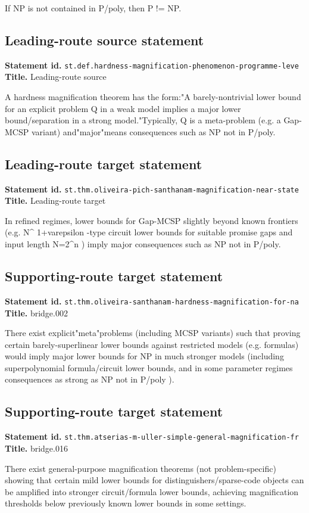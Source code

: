 \documentclass[11pt]{article}
\begin{document}
If NP is not contained in P/poly, then P != NP.
\subsection*{Leading-route source statement}
\textbf{Statement id.} \texttt{st.def.hardness-magnification-phenomenon-programme-leve}
\textbf{Title.} Leading-route source

A hardness magnification theorem has the form:"A barely-nontrivial lower bound for an explicit problem Q in a weak model implies a major lower bound/separation in a strong model."Typically, Q is a meta-problem (e.g. a Gap-MCSP variant) and"major"means consequences such as NP not in P/poly.
\subsection*{Leading-route target statement}
\textbf{Statement id.} \texttt{st.thm.oliveira-pich-santhanam-magnification-near-state}
\textbf{Title.} Leading-route target

In refined regimes, lower bounds for Gap-MCSP slightly beyond known frontiers (e.g. N\textasciicircum{} 1+varepsilon -type circuit lower bounds for suitable promise gaps and input length N=2\textasciicircum{}n ) imply major consequences such as NP not in P/poly.
\subsection*{Supporting-route target statement}
\textbf{Statement id.} \texttt{st.thm.oliveira-santhanam-hardness-magnification-for-na}
\textbf{Title.} bridge.002

There exist explicit"meta"problems (including MCSP variants) such that proving certain barely-superlinear lower bounds against restricted models (e.g. formulas) would imply major lower bounds for NP in much stronger models (including superpolynomial formula/circuit lower bounds, and in some parameter regimes consequences as strong as NP not in P/poly ).
\subsection*{Supporting-route target statement}
\textbf{Statement id.} \texttt{st.thm.atserias-m-uller-simple-general-magnification-fr}
\textbf{Title.} bridge.016

There exist general-purpose magnification theorems (not problem-specific) showing that certain mild lower bounds for distinguishers/sparse-code objects can be amplified into stronger circuit/formula lower bounds, achieving magnification thresholds below previously known lower bounds in some settings.
\end{document}
